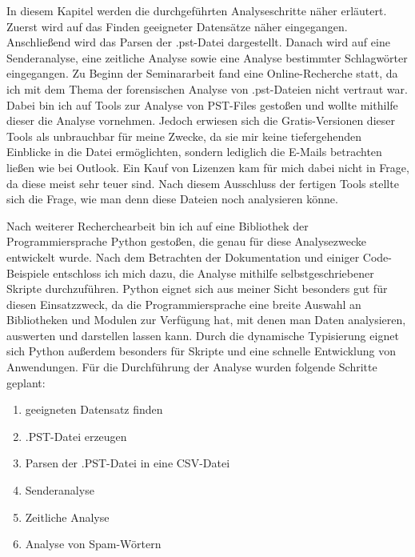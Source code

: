 \noindent In diesem Kapitel werden die durchgeführten Analyseschritte näher erläutert. Zuerst wird auf das Finden geeigneter Datensätze näher eingegangen. Anschließend wird das Parsen der .pst-Datei dargestellt. Danach wird auf eine Senderanalyse, eine zeitliche Analyse sowie eine Analyse bestimmter Schlagwörter eingegangen. Zu Beginn der Seminararbeit fand eine Online-Recherche statt, da ich mit dem Thema der forensischen Analyse von .pst-Dateien nicht vertraut war. Dabei bin ich auf Tools zur Analyse von PST-Files gestoßen und wollte mithilfe dieser die Analyse vornehmen. Jedoch erwiesen sich die Gratis-Versionen dieser Tools als unbrauchbar für meine Zwecke, da sie mir keine tiefergehenden Einblicke in die Datei ermöglichten, sondern lediglich die E-Mails betrachten ließen wie bei Outlook. Ein Kauf von Lizenzen kam für mich dabei nicht in Frage, da diese meist sehr teuer sind. Nach diesem Ausschluss der fertigen Tools stellte sich die Frage, wie man denn diese Dateien noch analysieren könne. \smallskip


\noindent Nach weiterer Recherchearbeit bin ich auf eine Bibliothek der Programmiersprache Python gestoßen, die genau für diese Analysezwecke entwickelt wurde. Nach dem Betrachten der Dokumentation und einiger Code-Beispiele entschloss ich mich dazu, die Analyse mithilfe selbstgeschriebener Skripte durchzuführen. Python eignet sich aus meiner Sicht besonders gut für diesen Einsatzzweck, da die Programmiersprache eine breite Auswahl an Bibliotheken und Modulen zur Verfügung hat, mit denen man Daten analysieren, auswerten und darstellen lassen kann. Durch die dynamische Typisierung eignet sich Python außerdem besonders für Skripte und eine schnelle Entwicklung von Anwendungen. Für die Durchführung der Analyse wurden folgende Schritte geplant:

\begin{enumerate}
    \item geeigneten Datensatz finden
    \item .PST-Datei erzeugen 
    \item Parsen der .PST-Datei in eine CSV-Datei
    \item Senderanalyse
    \item Zeitliche Analyse
    \item Analyse von Spam-Wörtern
\end{enumerate}
\newpage